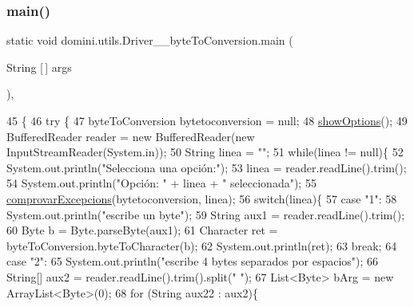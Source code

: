 \subsubsection{\texorpdfstring{main()}{main()}}
{\footnotesize\ttfamily static void domini.\+utils.\+Driver\+\_\+\+\_\+byte\+To\+Conversion.\+main (\begin{DoxyParamCaption}\item[{String \mbox{[}$\,$\mbox{]}}]{args }\end{DoxyParamCaption})\hspace{0.3cm}{\ttfamily [inline]}, {\ttfamily [static]}}


\begin{DoxyCode}
45                                            \{
46     \textcolor{keywordflow}{try} \{
47         byteToConversion bytetoconversion = null;
48         \hyperlink{classdomini_1_1utils_1_1Driver____byteToConversion_a58412c0a63cc729003ca6d28bbc3b83b}{showOptions}();
49         BufferedReader reader = \textcolor{keyword}{new} BufferedReader(\textcolor{keyword}{new} InputStreamReader(System.in));
50         String linea = \textcolor{stringliteral}{""};
51         \textcolor{keywordflow}{while}(linea != null)\{
52             System.out.println(\textcolor{stringliteral}{"Selecciona una opción:"});
53             linea = reader.readLine().trim();
54             System.out.println(\textcolor{stringliteral}{"Opción: "} + linea + \textcolor{stringliteral}{" seleccionada"});
55             \hyperlink{classdomini_1_1utils_1_1Driver____byteToConversion_a82c589da57bedb139b9254c8623a7fd4}{comprovarExcepcions}(bytetoconversion, linea);
56             \textcolor{keywordflow}{switch}(linea)\{
57                 \textcolor{keywordflow}{case} \textcolor{stringliteral}{"1"}:
58                     System.out.println(\textcolor{stringliteral}{"escribe un byte"});
59                     String aux1 = reader.readLine().trim();
60                     Byte b = Byte.parseByte(aux1);
61                     Character ret = byteToConversion.byteToCharacter(b);
62                     System.out.println(ret);
63                 \textcolor{keywordflow}{break};
64                 \textcolor{keywordflow}{case} \textcolor{stringliteral}{"2"}:
65                     System.out.println(\textcolor{stringliteral}{"escribe 4 bytes separados por espacios"});
66                     String[] aux2 = reader.readLine().trim().split(\textcolor{stringliteral}{" "});
67                     List<Byte> bArg = \textcolor{keyword}{new} ArrayList<Byte>(0);
68                     \textcolor{keywordflow}{for} (String aux22 : aux2)\{

\end{DoxyCode}
